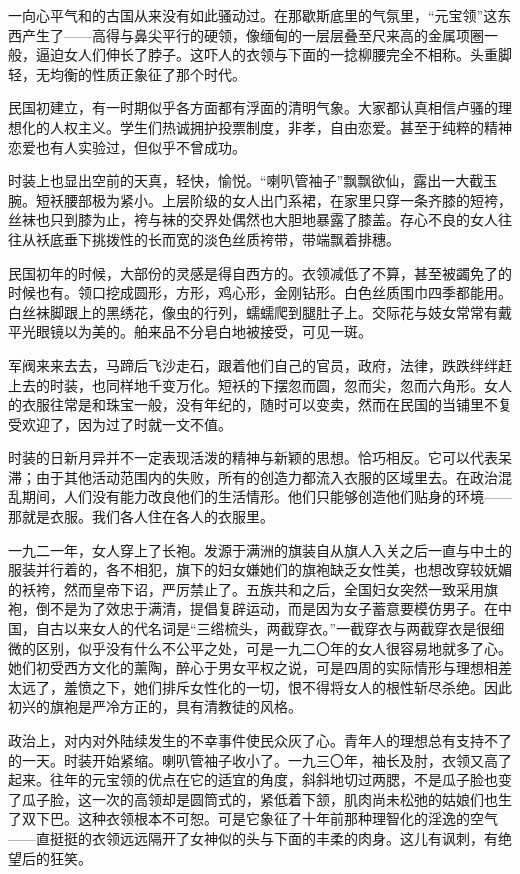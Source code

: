 \par 一向心平气和的古国从来没有如此骚动过。在那歇斯底里的气氛里，“元宝领”这东西产生了——高得与鼻尖平行的硬领，像缅甸的一层层叠至尺来高的金属项圈一般，逼迫女人们伸长了脖子。这吓人的衣领与下面的一捻柳腰完全不相称。头重脚轻，无均衡的性质正象征了那个时代。
\par 民国初建立，有一时期似乎各方面都有浮面的清明气象。大家都认真相信卢骚的理想化的人权主义。学生们热诚拥护投票制度，非孝，自由恋爱。甚至于纯粹的精神恋爱也有人实验过，但似乎不曾成功。
\par 时装上也显出空前的天真，轻快，愉悦。“喇叭管袖子”飘飘欲仙，露出一大截玉腕。短袄腰部极为紧小。上层阶级的女人出门系裙，在家里只穿一条齐膝的短袴，丝袜也只到膝为止，袴与袜的交界处偶然也大胆地暴露了膝盖。存心不良的女人往往从袄底垂下挑拨性的长而宽的淡色丝质袴带，带端飘着排穗。
\par 民国初年的时候，大部份的灵感是得自西方的。衣领减低了不算，甚至被蠲免了的时候也有。领口挖成圆形，方形，鸡心形，金刚钻形。白色丝质围巾四季都能用。白丝袜脚跟上的黑绣花，像虫的行列，蠕蠕爬到腿肚子上。交际花与妓女常常有戴平光眼镜以为美的。舶来品不分皂白地被接受，可见一斑。
\par 军阀来来去去，马蹄后飞沙走石，跟着他们自己的官员，政府，法律，跌跌绊绊赶上去的时装，也同样地千变万化。短袄的下摆忽而圆，忽而尖，忽而六角形。女人的衣服往常是和珠宝一般，没有年纪的，随时可以变卖，然而在民国的当铺里不复受欢迎了，因为过了时就一文不值。
\par 时装的日新月异并不一定表现活泼的精神与新颖的思想。恰巧相反。它可以代表呆滞；由于其他活动范围内的失败，所有的创造力都流入衣服的区域里去。在政治混乱期间，人们没有能力改良他们的生活情形。他们只能够创造他们贴身的环境——那就是衣服。我们各人住在各人的衣服里。
\par 一九二一年，女人穿上了长袍。发源于满洲的旗装自从旗人入关之后一直与中土的服装并行着的，各不相犯，旗下的妇女嫌她们的旗袍缺乏女性美，也想改穿较妩媚的袄袴，然而皇帝下诏，严厉禁止了。五族共和之后，全国妇女突然一致采用旗袍，倒不是为了效忠于满清，提倡复辟运动，而是因为女子蓄意要模仿男子。在中国，自古以来女人的代名词是“三绺梳头，两截穿衣。”一截穿衣与两截穿衣是很细微的区别，似乎没有什么不公平之处，可是一九二〇年的女人很容易地就多了心。她们初受西方文化的薰陶，醉心于男女平权之说，可是四周的实际情形与理想相差太远了，羞愤之下，她们排斥女性化的一切，恨不得将女人的根性斩尽杀绝。因此初兴的旗袍是严冷方正的，具有清教徒的风格。
\par 政治上，对内对外陆续发生的不幸事件使民众灰了心。青年人的理想总有支持不了的一天。时装开始紧缩。喇叭管袖子收小了。一九三〇年，袖长及肘，衣领又高了起来。往年的元宝领的优点在它的适宜的角度，斜斜地切过两腮，不是瓜子脸也变了瓜子脸，这一次的高领却是圆筒式的，紧低着下颔，肌肉尚未松弛的姑娘们也生了双下巴。这种衣领根本不可恕。可是它象征了十年前那种理智化的淫逸的空气——直挺挺的衣领远远隔开了女神似的头与下面的丰柔的肉身。这儿有讽刺，有绝望后的狂笑。

